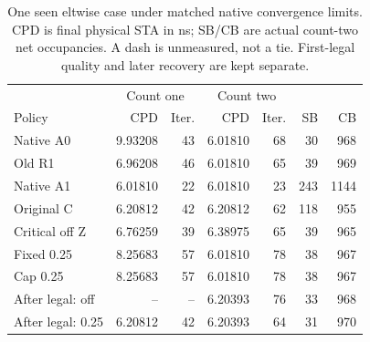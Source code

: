 \begin{table}[t]
\centering
\caption{One seen eltwise case under matched native convergence limits. CPD is final physical STA in ns; SB/CB are actual count-two net occupancies. A dash is unmeasured, not a tie. First-legal quality and later recovery are kept separate.}
\label{tab:guide-policy-stops}
\scriptsize
\begin{tabular}{lrrrrrr}
\hline
& \multicolumn{2}{c}{Count one} & \multicolumn{2}{c}{Count two} & & \\
Policy & CPD & Iter. & CPD & Iter. & SB & CB \\
\hline
Native A0 & 9.93208 & 43 & 6.01810 & 68 & 30 & 968 \\
Old R1 & 6.96208 & 46 & 6.01810 & 65 & 39 & 969 \\
Native A1 & 6.01810 & 22 & 6.01810 & 23 & 243 & 1144 \\
Original C & 6.20812 & 42 & 6.20812 & 62 & 118 & 955 \\
Critical off Z & 6.76259 & 39 & 6.38975 & 65 & 39 & 965 \\
Fixed 0.25 & 8.25683 & 57 & 6.01810 & 78 & 38 & 967 \\
Cap 0.25 & 8.25683 & 57 & 6.01810 & 78 & 38 & 967 \\
After legal: off & -- & -- & 6.20393 & 76 & 33 & 968 \\
After legal: 0.25 & 6.20812 & 42 & 6.20393 & 64 & 31 & 970 \\
\hline
\end{tabular}
\end{table}
